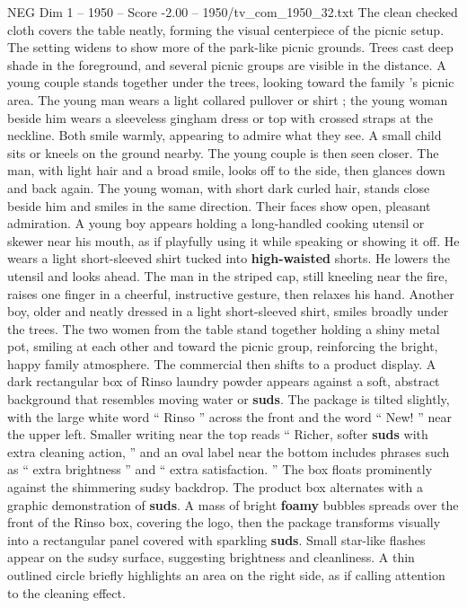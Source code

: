 \begin{textsample}{NEG Dim 1 – 1950 – Score -2.00 – 1950/tv\_com\_1950\_32.txt}
The clean checked cloth covers the table neatly, forming the visual centerpiece of the picnic setup.
The setting widens to show more of the park-like picnic grounds.
Trees cast deep shade in the foreground, and several picnic groups are visible in the distance.
A young couple stands together under the trees, looking toward the family ’s picnic area.
The young man wears a light collared pullover or shirt ; the young woman beside him wears a sleeveless gingham dress or top with crossed straps at the neckline.
Both smile warmly, appearing to admire what they see.
A small child sits or kneels on the ground nearby.
The young couple is then seen closer.
The man, with light hair and a broad smile, looks off to the side, then glances down and back again.
The young woman, with short dark curled hair, stands close beside him and smiles in the same direction.
Their faces show open, pleasant admiration.
A young boy appears holding a long-handled cooking utensil or skewer near his mouth, as if playfully using it while speaking or showing it off.
He wears a light short-sleeved shirt tucked into \textbf{high-waisted} shorts.
He lowers the utensil and looks ahead.
The man in the striped cap, still kneeling near the fire, raises one finger in a cheerful, instructive gesture, then relaxes his hand.
Another boy, older and neatly dressed in a light short-sleeved shirt, smiles broadly under the trees.
The two women from the table stand together holding a shiny metal pot, smiling at each other and toward the picnic group, reinforcing the bright, happy family atmosphere.
The commercial then shifts to a product display.
A dark rectangular box of Rinso laundry powder appears against a soft, abstract background that resembles moving water or \textbf{suds}.
The package is tilted slightly, with the large white word “ Rinso ” across the front and the word “ New! ” near the upper left.
Smaller writing near the top reads “ Richer, softer \textbf{suds} with extra cleaning action, ” and an oval label near the bottom includes phrases such as “ extra brightness ” and “ extra satisfaction. ” The box floats prominently against the shimmering sudsy backdrop.
The product box alternates with a graphic demonstration of \textbf{suds}.
A mass of bright \textbf{foamy} bubbles spreads over the front of the Rinso box, covering the logo, then the package transforms visually into a rectangular panel covered with sparkling \textbf{suds}.
Small star-like flashes appear on the sudsy surface, suggesting brightness and cleanliness.
A thin outlined circle briefly highlights an area on the right side, as if calling attention to the cleaning effect.

\end{textsample}
